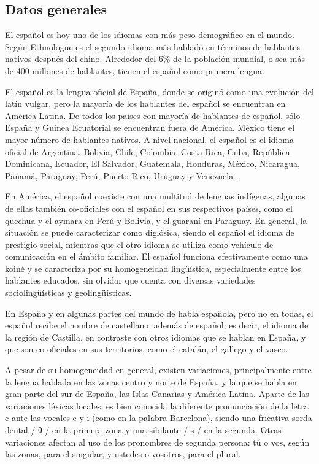 \begin{multicols}{2}
\subsection{Datos generales}

El español es hoy uno de los idiomas con más peso demográfico en el mundo. Según Ethnologue \cite{ethnologue} es el segundo idioma más hablado en términos de hablantes nativos después del chino. Alrededor del 6\% de la población mundial, o sea más de 400 millones de hablantes, tienen el español como primera lengua.

El español es la lengua oficial de España, donde se originó como una evolución del latín vulgar, pero la mayoría de los hablantes del español se encuentran en América Latina. De todos los países con mayoría de hablantes de español, sólo España y Guinea Ecuatorial se encuentran fuera de América. México tiene el mayor número de hablantes nativos. A nivel nacional, el español es el idioma oficial de Argentina, Bolivia, Chile, Colombia, Costa Rica, Cuba, República Dominicana, Ecuador, El Salvador, Guatemala, Honduras, México, Nicaragua, Panamá, Paraguay, Perú, Puerto Rico, Uruguay y Venezuela \cite{atlasspanish}.

En América, el español coexiste con una multitud de lenguas indígenas, algunas de ellas también co-oficiales con el español en sus respectivos países, como el quechua y el aymara en Perú y Bolivia, y el guaraní en Paraguay. En general, la situación se puede caracterizar como diglósica, siendo el español el idioma de prestigio social, mientras que el otro idioma se utiliza como vehículo de comunicación en el ámbito familiar. El español funciona efectivamente como una koiné y se caracteriza por su homogeneidad lingüística, especialmente entre los hablantes educados, sin olvidar que cuenta con diversas variedades sociolingüísticas y geolingüísticas.

En España y en algunas partes del mundo de habla española, pero no en todas, el español recibe el nombre de castellano, además de español, es decir, el idioma de la región de Castilla, en contraste con otros idiomas que se hablan en España, y que son co-oficiales en sus territorios, como el catalán, el gallego y el vasco.

A pesar de su homogeneidad en general, existen variaciones, principalmente entre la lengua hablada en las zonas centro y norte de España, y la que se habla en gran parte del sur de España, las Islas Canarias y América Latina. Aparte de las variaciones léxicas locales, es bien conocida la diferente pronunciación de la letra c ante las vocales e y i (como en la palabra Barcelona), siendo una fricativa sorda dental / θ /  en la primera zona y una sibilante / s / en la segunda. Otras variaciones afectan al uso de los pronombres de segunda persona: tú o vos, según las zonas, para el singular, y ustedes o vosotros, para el plural.



\end{multicols}
